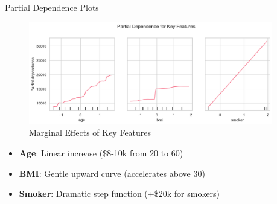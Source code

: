 \documentclass[10pt]{beamer}
\begin{document}
\begin{frame}{Partial Dependence Plots}
\begin{figure}
\includegraphics[width=0.95\textwidth]{pdp_core_features.png}
\caption{Marginal Effects of Key Features}
\end{figure}
\begin{itemize}
\item \textbf{Age}: Linear increase (\$8-10k from 20 to 60)
\item \textbf{BMI}: Gentle upward curve (accelerates above 30)
\item \textbf{Smoker}: Dramatic step function (+\$20k for smokers)
\end{itemize}
\end{frame}
\end{document}
